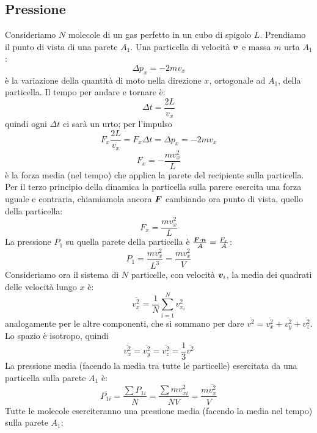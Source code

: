 \subsection{Pressione}
Consideriamo $N$ molecole di un gas perfetto in un cubo di spigolo $L$. Prendiamo il punto di vista di una parete $A_1$. Una particella di velocità $\boldsymbol{v}$ e massa $m$ urta $A_1$:
\begin{equation}
\Delta p_x=-2mv_x
\end{equation}
è la variazione della quantità di moto nella direzione $x$, ortogonale ad $A_1$, della particella. Il tempo per andare e tornare è:
\begin{equation}
\Delta t=\frac{2L}{v_x}
\end{equation}
quindi ogni $\Delta t$ ci sarà un urto; per l'impulso
$$
F_x\frac{2L}{v_x}=F_x\Delta t=\Delta p_x=-2mv_x
$$
\begin{equation}
F_x=-\frac{mv_x^2}{L}
\end{equation}
è la forza media (nel tempo) che applica la parete del recipiente sulla particella. Per il terzo principio della dinamica la particella sulla parere esercita una forza uguale e contraria, chiamiamola ancora $\boldsymbol{F}$ cambiando ora punto di vista, quello della particella:
\begin{equation}
F_x=\frac{mv_x^2}{L}
\end{equation}
La pressione $P_1$ su quella parete della particella è $\frac{\boldsymbol{F}\cdot \boldsymbol{n}}{A}=\frac{F_x}{A}$:
\begin{equation}
P_1=\frac{mv_x^2}{L^3}=\frac{mv_x^2}{V}
\end{equation}
Consideriamo ora il sistema di $N$ particelle, con velocità $\boldsymbol{v}_i$, la media dei quadrati delle velocità lungo $x$ è:
\begin{equation}
\overline{v_x^2}=\frac{1}{N}\sum_{i=1}^{N}{v_{x_i}^2}
\end{equation}
analogamente per le altre componenti, che si sommano per dare $\overline {v^2}=\overline{v_x^2}+\overline{v_y^2}+\overline{v_z^2}$. Lo spazio è isotropo, quindi
\begin{equation}
\overline{v_x^2}=\overline{v_y^2}=\overline{v_z^2}=\frac{1}{3}\overline{v^2}
\end{equation}
La pressione media (facendo la media tra tutte le particelle) esercitata da una particella sulla parete $A_1$ è:
$$\overline {P_{1i}} = \frac{\sum P_{1i}}{N}=\frac{\sum m v_{xi}^2}{NV}=\frac{m\overline{v_x^2}}{V}$$
Tutte le molecole eserciteranno una pressione media (facendo la media nel tempo) sulla parete $A_1$:
